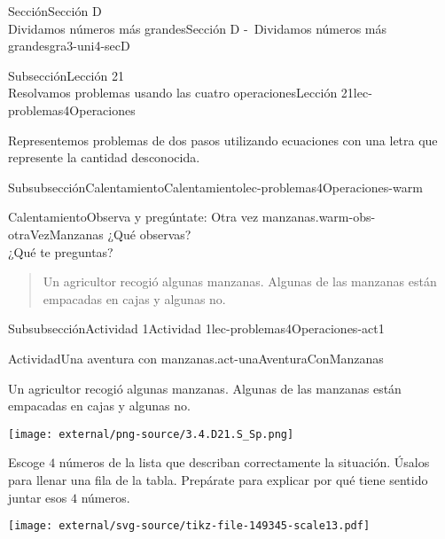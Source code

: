 \begin{sectionptx}{Sección}{{\Large Sección D\\}Dividamos números más grandes}{}{Sección D -~Dividamos números más grandes}{}{}{gra3-uni4-secD}
\begin{subsectionptx}{Subsección}{{\normalsize Lección 21\\[-0.05cm]}Resolvamos problemas usando las cuatro operaciones}{}{Lección 21}{}{}{lec-problemas4Operaciones}
\begin{introduction}{}%
Representemos problemas de dos pasos utilizando ecuaciones con una letra que represente la cantidad desconocida.%
\end{introduction}%
%
%
\typeout{************************************************}
\typeout{************************************************}
%
\begin{subsubsectionptx}{Subsubsección}{Calentamiento}{}{Calentamiento}{}{}{lec-problemas4Operaciones-warm}
\begin{exploration}{Calentamiento}{Observa y pregúntate: Otra vez manzanas.}{warm-obs-otraVezManzanas}%
¿Qué observas?\\
 ¿Qué te preguntas?%
\begin{quote}%
Un agricultor recogió algunas manzanas. Algunas de las manzanas están empacadas en cajas y algunas no.%
\end{quote}
\end{exploration}%
\end{subsubsectionptx}
%
%
\typeout{************************************************}
\typeout{************************************************}
%
\begin{subsubsectionptx}{Subsubsección}{Actividad 1}{}{Actividad 1}{}{}{lec-problemas4Operaciones-act1}
\begin{activity}{Actividad}{Una aventura con manzanas.}{act-unaAventuraConManzanas}%
\begin{sidebyside}{2}{0}{0}{0.1}%
\begin{sbspanel}{0.6}%
Un agricultor recogió algunas manzanas. Algunas de las manzanas están empacadas en cajas y algunas no.%
\end{sbspanel}%
\begin{sbspanel}{0.3}%
\texttt{[image: external/png-source/3.4.D21.S\_Sp.png]}
\end{sbspanel}%
\end{sidebyside}%
\par
Escoge \(4\) números de la lista que describan correctamente la situación. Úsalos para llenar una fila de la tabla. Prepárate para explicar por qué tiene sentido juntar esos \(4\) números.%
\begin{image}{0}{1}{0}{}%
\texttt{[image: external/svg-source/tikz-file-149345-scale13.pdf]}
\end{image}%
\begin{image}{0}{1}{0}{}%

\end{image}
\end{activity}
\end{subsubsectionptx}
\end{subsectionptx}
\end{sectionptx}

